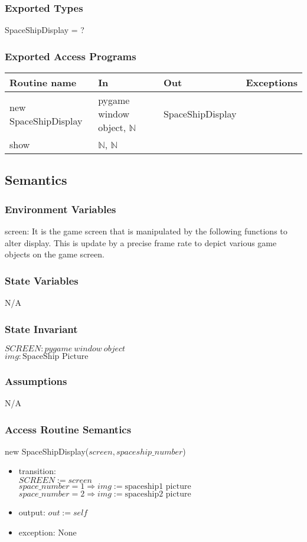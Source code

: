 \documentclass[12pt]{article}
\begin{document}
\subsubsection*{Exported Types}
SpaceShipDisplay = ?

\subsubsection*{Exported Access Programs}
\begin{tabular}{| l | l | l | l |}
\hline
\textbf{Routine name} & \textbf{In} & \textbf{Out} & \textbf{Exceptions}\\
\hline
new SpaceShipDisplay       &pygame window object, $\mathbb{N}$     &     SpaceShipDisplay      &           \\
\hline
show       &	$\mathbb{N}$,	$\mathbb{N}$     &           &          \\
\hline
\end{tabular}

\subsection*{Semantics}
\subsubsection*{Environment Variables}
screen: It is the game screen that is manipulated by the following functions to alter display. This is update by a precise frame rate to depict various game objects on the game screen.
\subsubsection*{State Variables}
N/A
\subsubsection*{State Invariant}
$SCREEN: pygame\ window\ object$\\
$img: \text{SpaceShip Picture}$
\subsubsection*{Assumptions}
N/A
\subsubsection*{Access Routine Semantics}

new SpaceShipDisplay($screen, spaceship\_number$)
\begin{itemize}
    \item transition: \\$SCREEN := screen$
    \\$space\_number = 1 \Rightarrow img := \text{spaceship1 picture}$
    \\$space\_number = 2 \Rightarrow img := \text{spaceship2 picture}$
    \item output: $out := self$
    \item exception: None
\end{itemize}
\end{document}
